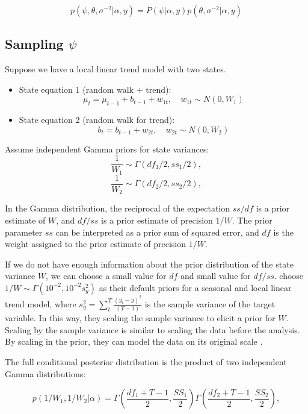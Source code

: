 $$p(\psi, \theta, \sigma^{-2}|\alpha, y ) = P(\psi |\alpha, y) p(\theta, \sigma^{-2} |\alpha, y) $$

\subsection{Sampling $\psi$}

Suppose we have a local linear trend model with two states. 


\begin{itemize}
	\item {State equation 1 (random walk + trend): $$\mu_t = \mu_{t-1} + b_{t-1} + w_{1t}, \quad w_{1t} \sim N(0, W_{1})$$}
	
	\item {State equation 2 (random walk for trend): $$b_t = b_{t-1} + w_{2t}, \quad w_{2t} \sim N(0, W_{2})$$}
\end{itemize}








Assume independent Gamma priors for state variances:
 $$\frac{1}{W_{1}}  \sim \Gamma(df_1/2, ss_1/2),$$  
 $$\frac{1}{W_{2}}  \sim \Gamma(df_2/2, ss_2/2),$$
 
In the Gamma distribution, the reciprocal of the expectation $ss/df$ is a prior estimate of $W$, and $df/ss$ is a prior estimate of precision $1/W$. The prior parameter $ss$ can be interpreted as a prior sum of squared error, and $df$ is the weight assigned to the prior estimate of precision $1/W$. 

If we do not have enough information about the prior distribution of the state variance $W$, we can choose a small value for $df$ and small value for $df/ss$.  choose $1/W \sim \Gamma (10^{-2}, 10^{-2} s_y^2)$ as their default priors for a seasonal and local linear trend model, where $s_y^2 = \sum_{t}^{T} \frac{(y_t - \bar{y})^2}{(T-1)}$ is the sample variance of the target variable. In this way, they scaling the sample variance to elicit a prior for $W$. Scaling by the sample variance is similar to scaling  the data before the analysis. By scaling in the prior,  they can model the data on its original scale \cite{Scott2014a,Brodersen2014}.  
 
 
The full conditional posterior distribution is the product of two independent Gamma distributions:

$$p(1/W_{1}, 1/W_{2}|\alpha) = \Gamma ( \frac{df_1 + T -1}{2}, \frac{SS_1}{2} ) \Gamma ( \frac{df_2 + T -1}{2}, \frac{SS_2}{2} ) ,$$ 

